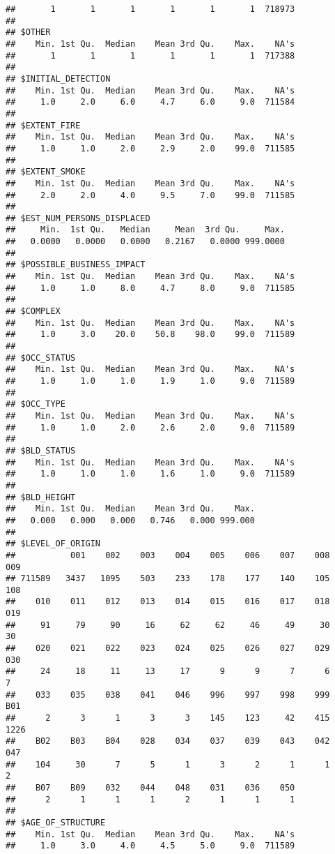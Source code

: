 \documentclass[]{article}
\begin{document}
\begin{verbatim}
##       1       1       1       1       1       1  718973 
## 
## $OTHER
##    Min. 1st Qu.  Median    Mean 3rd Qu.    Max.    NA's 
##       1       1       1       1       1       1  717388 
## 
## $INITIAL_DETECTION
##    Min. 1st Qu.  Median    Mean 3rd Qu.    Max.    NA's 
##     1.0     2.0     6.0     4.7     6.0     9.0  711584 
## 
## $EXTENT_FIRE
##    Min. 1st Qu.  Median    Mean 3rd Qu.    Max.    NA's 
##     1.0     1.0     2.0     2.9     2.0    99.0  711585 
## 
## $EXTENT_SMOKE
##    Min. 1st Qu.  Median    Mean 3rd Qu.    Max.    NA's 
##     2.0     2.0     4.0     9.5     7.0    99.0  711585 
## 
## $EST_NUM_PERSONS_DISPLACED
##     Min.  1st Qu.   Median     Mean  3rd Qu.     Max. 
##   0.0000   0.0000   0.0000   0.2167   0.0000 999.0000 
## 
## $POSSIBLE_BUSINESS_IMPACT
##    Min. 1st Qu.  Median    Mean 3rd Qu.    Max.    NA's 
##     1.0     1.0     8.0     4.7     8.0     9.0  711585 
## 
## $COMPLEX
##    Min. 1st Qu.  Median    Mean 3rd Qu.    Max.    NA's 
##     1.0     3.0    20.0    50.8    98.0    99.0  711589 
## 
## $OCC_STATUS
##    Min. 1st Qu.  Median    Mean 3rd Qu.    Max.    NA's 
##     1.0     1.0     1.0     1.9     1.0     9.0  711589 
## 
## $OCC_TYPE
##    Min. 1st Qu.  Median    Mean 3rd Qu.    Max.    NA's 
##     1.0     1.0     2.0     2.6     2.0     9.0  711589 
## 
## $BLD_STATUS
##    Min. 1st Qu.  Median    Mean 3rd Qu.    Max.    NA's 
##     1.0     1.0     1.0     1.6     1.0     9.0  711589 
## 
## $BLD_HEIGHT
##    Min. 1st Qu.  Median    Mean 3rd Qu.    Max. 
##   0.000   0.000   0.000   0.746   0.000 999.000 
## 
## $LEVEL_OF_ORIGIN
##           001    002    003    004    005    006    007    008    009 
## 711589   3437   1095    503    233    178    177    140    105    108 
##    010    011    012    013    014    015    016    017    018    019 
##     91     79     90     16     62     62     46     49     30     30 
##    020    021    022    023    024    025    026    027    029    030 
##     24     18     11     13     17      9      9      7      6      7 
##    033    035    038    041    046    996    997    998    999    B01 
##      2      3      1      3      3    145    123     42    415   1226 
##    B02    B03    B04    028    034    037    039    043    042    047 
##    104     30      7      5      1      3      2      1      1      2 
##    B07    B09    032    044    048    031    036    050 
##      2      1      1      1      2      1      1      1 
## 
## $AGE_OF_STRUCTURE
##    Min. 1st Qu.  Median    Mean 3rd Qu.    Max.    NA's 
##     1.0     3.0     4.0     4.5     5.0     9.0  711589 

\end{verbatim}
\end{document}
